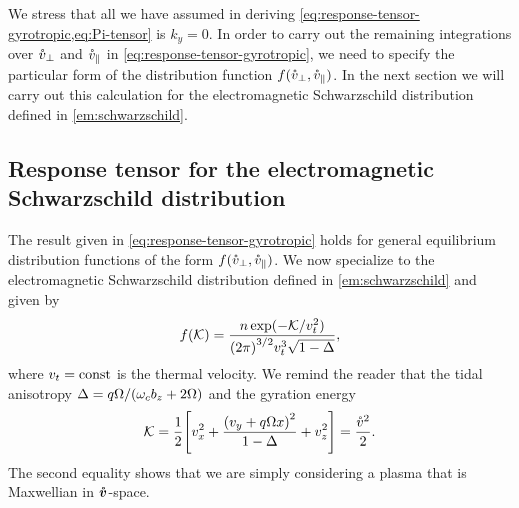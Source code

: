 \documentclass[aps,pre,notitlepage,amsmath,amssymb,amsfonts,nobibnotes,nofootinbib,superscriptaddress]{revtex4-1}
\begin{document}
We stress that all we have assumed in deriving
\cref{eq:response-tensor-gyrotropic,eq:Pi-tensor} is $k_y=0$. In order to
carry out the remaining integrations over $\mathring{v}_\perp$ and $\mathring{v}_\parallel$ in
\cref{eq:response-tensor-gyrotropic}, we need to specify the particular form
of the distribution function $f(\mathring{v}_\perp,\mathring{v}_\parallel)$. In the next section
we will carry out this calculation for the electromagnetic Schwarzschild
distribution defined in \cref{em:schwarzschild}.

\subsection{Response tensor for the electromagnetic Schwarzschild distribution}
\label{sec:schwarzschild-response}

The result given in \cref{eq:response-tensor-gyrotropic} holds for general
equilibrium distribution functions of the form $f(\mathring{v}_\perp,\mathring{v}_\parallel)$.
We now specialize to the electromagnetic Schwarzschild distribution defined in
\cref{em:schwarzschild} and given by
\begin{equation}
  \label{em:schwarzschild-2}
  f(\mathcal{K}) =
  \frac{n\exp(-\mathcal{K}/\vt^2)}{{(2\pi)}^{3/2}\vt^3\sqrt{1-\Delta}},
\end{equation}
where $v_t=\mathrm{const}$ is the thermal velocity. We remind the reader that
the tidal anisotropy \mbox{$\Delta=q\Omega/(\omega_c{}b_z+2\Omega)$} and the
gyration energy
\begin{equation}
  \mathcal{K} = \frac{1}{2}
  \left[v_x^2 + \frac{{(v_y + q\Omega x)}^2}{1 - \Delta} + v_z^2\right] =
  \frac{\vc^2}{2}.
\end{equation}
The second equality shows that we are simply considering a plasma that is
Maxwellian in $\bm{\mathring{v}}$-space.
\end{document}
